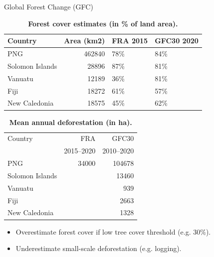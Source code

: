 \documentclass[10pt,table,dvipsnames,compress]{beamer}
\begin{document}
\begin{frame}[label={sec:orge517c13}]{Global Forest Change (GFC)}
\begin{table}[htbp]
\caption{\textbf{Forest cover estimates (in \% of land area).}}
\centering
\footnotesize
\begin{tabular}{lrll}
Country & Area (km2) & FRA 2015 & GFC30 2020\\[0pt]
\hline
PNG & 462840 & 78\% & 84\%\\[0pt]
Solomon Islands & 28896 & 87\% & 81\%\\[0pt]
Vanuatu & 12189 & 36\% & 81\%\\[0pt]
Fiji & 18272 & 61\% & 57\%\\[0pt]
New Caledonia & 18575 & 45\% & 62\%\\[0pt]
\end{tabular}
\end{table}

\begin{table}[htbp]
\caption{\textbf{Mean annual deforestation (in ha).}}
\centering
\footnotesize
\begin{tabular}{lrr}
Country & FRA & GFC30\\[0pt]
 & 2015--2020 & 2010--2020\\[0pt]
\hline
PNG & 34000 & 104678\\[0pt]
Solomon Islands &  & 13460\\[0pt]
Vanuatu &  & 939\\[0pt]
Fiji &  & 2663\\[0pt]
New Caledonia &  & 1328\\[0pt]
\end{tabular}
\end{table}

\begin{itemize}
\item Overestimate forest cover if low tree cover threshold (e.g. 30\%).
\item Underestimate small-scale deforestation (e.g. logging).
\end{itemize}
\end{frame}
\end{document}
